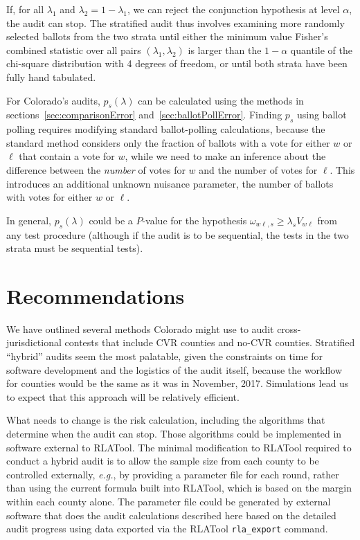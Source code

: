 \documentclass[runningheads]{llncs}
\begin{document}
If, for all $\lambda_1$ and $\lambda_2 = 1- \lambda_1$, we can reject the conjunction
hypothesis at level $\alpha$, the audit can stop.
The stratified audit thus involves examining more randomly selected ballots from the two strata until 
either the minimum value Fisher's combined statistic over all pairs $(\lambda_1, \lambda_2)$ is larger than the $1-\alpha$ quantile of the chi-square
distribution with 4 degrees of freedom, or until both strata have been fully hand tabulated.

For Colorado's audits, $p_s(\lambda)$ can be calculated using the methods in 
sections~\ref{sec:comparisonError} and~\ref{sec:ballotPollError}.
Finding $p_s$ using ballot polling requires modifying standard ballot-polling calculations,
because the standard method considers only the fraction of ballots with a vote for either 
$w$ or $\ell$ that contain a vote for $w$, while we need to make an inference about the 
difference between the \emph{number} of votes for $w$ and the number of votes for $\ell$.
This introduces an additional unknown nuisance parameter, the number of ballots with votes for either
$w$ or $\ell$.

In general, $p_s(\lambda)$ could be a $P$-value for the hypothesis
$\omega_{w\ell,s} \ge \lambda_s V_{w\ell}$ from any test procedure (although
if the audit is to be sequential, the tests in the two strata must be sequential tests). 

%



\section{Recommendations} \label{sec:recommendations}

We have outlined several methods Colorado might use to audit cross-jurisdictional contests
that include CVR counties and no-CVR counties.
Stratified ``hybrid'' audits seem the most palatable,
given the constraints on time for software development and the logistics
of the audit itself, because the workflow for counties would be the same
as it was in November, 2017.
Simulations lead us to expect that this approach will be relatively efficient.

What needs to change is the risk calculation, including the
algorithms that determine when the audit can stop.
Those algorithms could be implemented in software external to RLATool.
The minimal modification to RLATool required to conduct
a hybrid audit is to allow the sample size from each county to be controlled externally,
\emph{e.g.}, by providing a parameter file for each round,
rather than using the current formula built into RLATool, 
which is based on the margin within each county alone.
The parameter file could be generated by external software that does the
audit calculations described here based on the detailed
audit progress using data exported via the RLATool \texttt{rla\_export} command.
\end{document}
